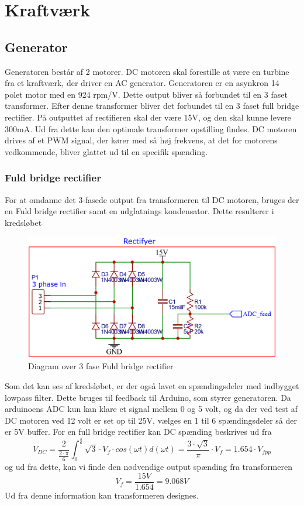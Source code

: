 \documentclass[../main.tex]{subfiles}
\begin{document}
\chapter{Kraftværk} \label{Chap:Kraftværk}

\section{Generator}
Generatoren består af 2 motorer. DC motoren skal forestille at være en turbine fra et kraftværk, der driver en AC generator. Generatoren er en asynkron 14 polet motor med en 924 rpm/V. Dette output bliver så forbundet til en 3 faset transformer. Efter denne transformer bliver det forbundet til en 3 faset full bridge rectifier. På outputtet af rectifieren skal der være 15V, og den skal kunne levere 300mA. Ud fra dette kan den optimale transformer opstilling findes. DC motoren drives af et PWM signal, der kører med så høj frekvens, at det for motorens vedkommende, bliver glattet ud til en specifik spænding.

\subsection{Fuld bridge rectifier}
For at omdanne det 3-fasede output fra transformeren til DC motoren, bruges der en Fuld bridge rectifier samt en udglatnings kondensator. Dette resulterer i kredsløbet 

\begin{figure}[H]
      \includegraphics[width=\textwidth]{Dokumentation/Figures/Rectifyer_dig.png}
     \caption{Diagram over 3 fase Fuld bridge rectifier}
     \label{fig: Rectifyer_dig}
     \end{figure}
Som det kan ses af kredsløbet, er der også lavet en spændingsdeler med indbygget lowpass filter. Dette bruges til feedback til Arduino, som styrer generatoren. Da arduinoens ADC kun kan klare et signal mellem 0 og 5 volt, og da der ved test af DC motoren ved 12 volt er set op til 25V, vælges en 1 til 6 spændingsdeler så der er 5V buffer.
For en full bridge rectifier kan DC spænding beskrives ud fra 
$$ V_{DC} = \frac{2}{\frac{2 \cdot \pi}{6}}\int_{0}^{\frac{\pi}{6}}\sqrt{3}\cdot V_f \cdot cos(\omega t) d(\omega t) = \frac{3 \cdot \sqrt{3}}{\pi} \cdot V_f = 1.654 \cdot V_{fpp} $$
og ud fra dette, kan vi finde den nødvendige output spænding fra transformeren 
$$ V_{f}= \frac{15V}{1.654} = 9.068V$$
Ud fra denne information kan transformeren designes.
\end{document}

